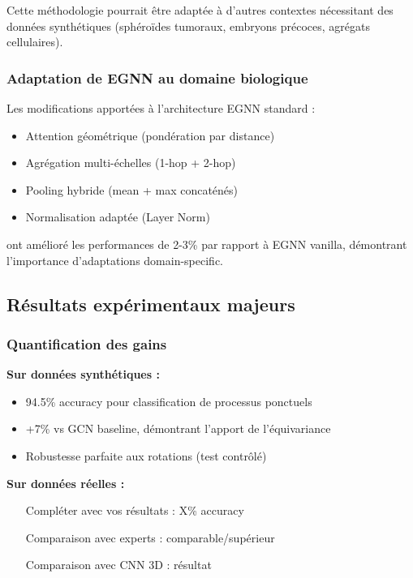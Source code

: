 Cette méthodologie pourrait être adaptée à d'autres contextes nécessitant des données synthétiques (sphéroïdes tumoraux, embryons précoces, agrégats cellulaires).

\subsubsection{Adaptation de EGNN au domaine biologique}

Les modifications apportées à l'architecture EGNN standard :
\begin{itemize}
    \item Attention géométrique (pondération par distance)
    \item Agrégation multi-échelles (1-hop + 2-hop)
    \item Pooling hybride (mean + max concaténés)
    \item Normalisation adaptée (Layer Norm)
\end{itemize}

ont amélioré les performances de 2-3\% par rapport à EGNN vanilla, démontrant l'importance d'adaptations domain-specific.

\subsection{Résultats expérimentaux majeurs}

\subsubsection{Quantification des gains}

\textbf{Sur données synthétiques :}
\begin{itemize}
    \item 94.5\% accuracy pour classification de processus ponctuels
    \item +7\% vs GCN baseline, démontrant l'apport de l'équivariance
    \item Robustesse parfaite aux rotations (test contrôlé)
\end{itemize}

\textbf{Sur données réelles :}
\begin{itemize}
    \item [Compléter avec vos résultats : X\% accuracy]
    \item [Comparaison avec experts : comparable/supérieur]
    \item [Comparaison avec CNN 3D : résultat]
\end{itemize}

